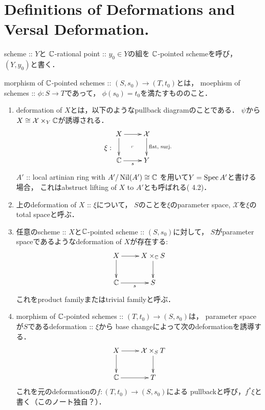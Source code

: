 \documentclass[a4paper]{jsarticle}
\newcommand{\famX}{\mathcal{X}}
\begin{document}
\section{Definitions of Deformations and Versal Deformation.}
\begin{Def}
    scheme :: $Y$と
    $\mathbb{C}$-rational point :: $y_0 \in Y$の組を
    $\mathbb{C}$-pointed schemeを呼び，$(Y, y_0)$と書く．

    morphism of $\mathbb{C}$-pointed schemes :: $(S, s_0) \to (T, t_0)$とは，
    moephism of schemes :: $\phi: S \to T$であって，
    $\phi(s_0)=t_0$を満たすもののこと．
\end{Def}

\begin{Def}
    \begin{enumerate}[label=(\roman*), leftmargin=*]
    \item 
        deformation of $X$とは，以下のようなpullback diagramのことである．
        $\psi$から$X \iso \famX \times_{Y} \C$が誘導される．
        \[
            \xi:
        \vcenter{\xymatrix{
            X \ar[r] \ar[d]& \famX \ar[d]^-{\text{flat, surj.}} \\
            \C \ar[r]_-{s}& Y
            \ar@{}[lu]|{\ulcorner}
        }}
        \]
        $A'$ :: local artinian ring with $A'/\operatorname{Nil}(A') \cong \mathbb{C}$
        を用いて$Y=\operatorname{Spec} A'$と書ける場合，
        これはabstruct lifting of $X$ to $A'$とも呼ばれる(\cite{DefLCI} 4.2)．

    \item
        上のdeformation of $X$ :: $\xi$について，
        $S$のことを$\xi$のparameter space,
        $\famX$を$\xi$のtotal spaceと呼ぶ．

    \item
        任意のscheme :: $X$と$\mathbb{C}$-pointed scheme :: $(S, s_0)$に対して，
        $S$がparameter spaceであるようなdeformation of $X$が存在する:
        \[\xymatrix{
                X \ar[r]\ar[d]& X \times_{\C} S \ar[d]\\
                \C \ar[r]_-{s}& S
        }\]
        これをproduct familyまたはtrivial familyと呼ぶ．

    \item
        morphism of $\mathbb{C}$-pointed schemes :: $(T, t_0) \to (S, s_0)$は，
        parameter spaceが$S$であるdeformation :: $\xi$から
        base changeによって次のdeformationを誘導する．
        \[\xymatrix{
            X \ar[r]\ar[d]& \famX \times_S T \ar[d]\\
            \C \ar[r]& T
        }\]
        これを元のdeformationの$f: (T, t_0) \to (S, s_0)$による
        pullbackと呼び，$f^* \xi$と書く（このノート独自？）．


\end{enumerate}
\end{Def}
\end{document}
